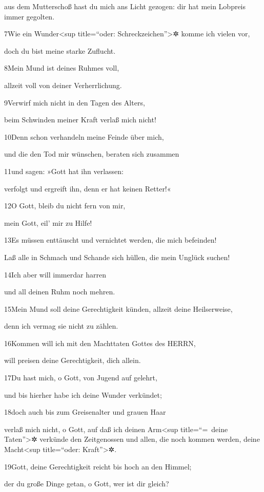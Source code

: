 aus dem Mutterschoß hast du mich ans Licht gezogen: dir hat mein
Lobpreis immer gegolten.

7Wie ein Wunder\textless sup title=``oder: Schreckzeichen''\textgreater✲
komme ich vielen vor,

doch du bist meine starke Zuflucht.

8Mein Mund ist deines Ruhmes voll,

allzeit voll von deiner Verherrlichung.

9Verwirf mich nicht in den Tagen des Alters,

beim Schwinden meiner Kraft verlaß mich nicht!

10Denn schon verhandeln meine Feinde über mich,

und die den Tod mir wünschen, beraten sich zusammen

11und sagen: »Gott hat ihn verlassen:

verfolgt und ergreift ihn, denn er hat keinen Retter!«

12O Gott, bleib du nicht fern von mir,

mein Gott, eil' mir zu Hilfe!

13Es müssen enttäuscht und vernichtet werden, die mich befeinden!

Laß alle in Schmach und Schande sich hüllen, die mein Unglück suchen!

14Ich aber will immerdar harren

und all deinen Ruhm noch mehren.

15Mein Mund soll deine Gerechtigkeit künden, allzeit deine Heilserweise,

denn ich vermag sie nicht zu zählen.

16Kommen will ich mit den Machttaten Gottes des HERRN,

will preisen deine Gerechtigkeit, dich allein.

17Du hast mich, o Gott, von Jugend auf gelehrt,

und bis hierher habe ich deine Wunder verkündet;

18doch auch bis zum Greisenalter und grauen Haar

verlaß mich nicht, o Gott, auf daß ich deinen Arm\textless sup
title=``=~deine Taten''\textgreater✲ verkünde den Zeitgenossen und
allen, die noch kommen werden, deine Macht\textless sup title=``oder:
Kraft''\textgreater✲.

19Gott, deine Gerechtigkeit reicht bis hoch an den Himmel;

der du große Dinge getan, o Gott, wer ist dir gleich?


